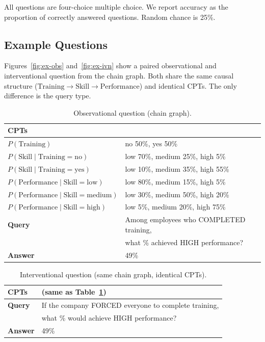 \documentclass[11pt,a4paper]{article}
\begin{document}
All questions are four-choice multiple choice. We report accuracy as the proportion of correctly answered questions. Random chance is 25\%.

\subsection{Example Questions}

Figures~\ref{fig:ex-obs} and~\ref{fig:ex-ivn} show a paired observational and interventional question from the chain graph. Both share the same causal structure ($\text{Training} \rightarrow \text{Skill} \rightarrow \text{Performance}$) and identical CPTs. The only difference is the query type.

\begin{table}[h]
\centering
\caption{Observational question (chain graph).}
\label{tab:ex-obs}
\begin{tabular}{ll}
\toprule
\textbf{CPTs} & \\
\midrule
$P(\text{Training})$ & no 50\%, yes 50\% \\
$P(\text{Skill} \mid \text{Training}=\text{no})$ & low 70\%, medium 25\%, high 5\% \\
$P(\text{Skill} \mid \text{Training}=\text{yes})$ & low 10\%, medium 35\%, high 55\% \\
$P(\text{Performance} \mid \text{Skill}=\text{low})$ & low 80\%, medium 15\%, high 5\% \\
$P(\text{Performance} \mid \text{Skill}=\text{medium})$ & low 30\%, medium 50\%, high 20\% \\
$P(\text{Performance} \mid \text{Skill}=\text{high})$ & low 5\%, medium 20\%, high 75\% \\
\midrule
\textbf{Query} & Among employees who COMPLETED training, \\
 & what \% achieved HIGH performance? \\
\textbf{Answer} & 49\% \\
\bottomrule
\end{tabular}
\end{table}

\begin{table}[h]
\centering
\caption{Interventional question (same chain graph, identical CPTs).}
\label{tab:ex-ivn}
\begin{tabular}{ll}
\toprule
\textbf{CPTs} & (same as Table~\ref{tab:ex-obs}) \\
\midrule
\textbf{Query} & If the company FORCED everyone to complete training, \\
 & what \% would achieve HIGH performance? \\
\textbf{Answer} & 49\% \\
\bottomrule
\end{tabular}
\end{table}
\end{document}
